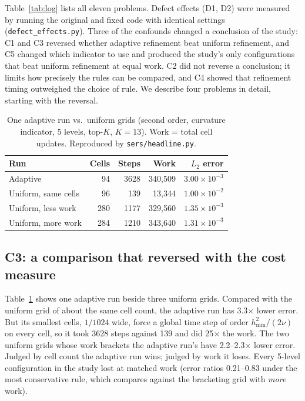 \documentclass[conference]{IEEEtran}
\begin{document}
Table~\ref{tab:log} lists all eleven problems. Defect effects (D1, D2)
were measured by running the original and fixed code with identical
settings (\texttt{defect\_effects.py}). Three of the confounds changed a
conclusion of the study: C1 and C3 reversed whether adaptive refinement beat
uniform refinement, and C5 changed which indicator to use and produced the
study's only configurations that beat uniform refinement at equal work. C2
did not reverse a conclusion; it limits how precisely the rules can be
compared, and C4 showed that refinement timing outweighed the choice of
rule. We describe four problems in detail, starting with the reversal.

\begin{table}[t]
\caption{One adaptive run vs.\ uniform grids (second order, curvature
indicator, 5 levels, top-$K$, $K{=}13$). Work = total cell updates.
Reproduced by \texttt{sers/headline.py}.}
\label{tab:reversal}
\centering
\small
\begin{tabular}{@{}l r r r r@{}}
\toprule
Run & Cells & Steps & Work & $L_2$ error \\
\midrule
Adaptive & 94 & 3628 & 340{,}509 & $3.00\times10^{-3}$ \\
Uniform, same cells & 96 & 139 & 13{,}344 & $1.00\times10^{-2}$ \\
Uniform, less work & 280 & 1177 & 329{,}560 & $1.35\times10^{-3}$ \\
Uniform, more work & 284 & 1210 & 343{,}640 & $1.31\times10^{-3}$ \\
\bottomrule
\end{tabular}
\end{table}

\subsection{C3: a comparison that reversed with the cost measure}
Table~\ref{tab:reversal} shows one adaptive run beside three uniform grids.
Compared with the uniform grid of about the same cell count, the adaptive
run has 3.3$\times$ lower error. But its smallest cells, $1/1024$ wide,
force a global time step of order $h_{\min}^2/(2\nu)$ on every cell, so it
took 3628 steps against 139 and did 25$\times$ the work. The two uniform
grids whose work brackets the adaptive run's have 2.2--2.3$\times$
lower error. Judged by cell count the adaptive run wins; judged by work it
loses. Every 5-level configuration in the study lost at matched work
(error ratios 0.21--0.83 under the most conservative rule, which compares
against the bracketing grid with \emph{more} work).
\end{document}
